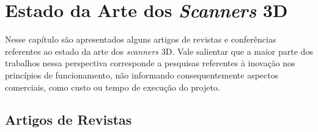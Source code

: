 \chapter{Estado da Arte dos \textit{Scanners} 3D} %
\thispagestyle{empty}

Nesse capítulo são apresentados alguns artigos de revistas e conferências referentes ao estado da arte dos \textit{scanners} 3D. Vale salientar que a maior parte dos trabalhos nessa perspectiva corresponde a pesquisas referentes à inovação nos princípios de funcionamento, não informando consequentemente aspectos comerciais, como custo ou tempo de execução do projeto.

\section{Artigos de Revistas}
